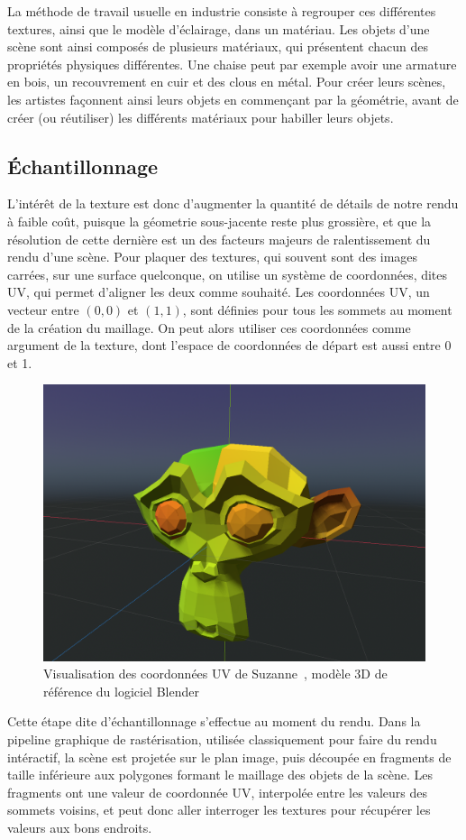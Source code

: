 La méthode de travail usuelle en industrie consiste à regrouper ces différentes textures, ainsi que le modèle d'éclairage, dans un matériau. Les objets d'une scène sont ainsi composés de plusieurs matériaux, qui présentent chacun des propriétés physiques différentes. Une chaise peut par exemple avoir une armature en bois, un recouvrement en cuir et des clous en métal. Pour créer leurs scènes, les artistes façonnent ainsi leurs objets en commençant par la géométrie, avant de créer (ou réutiliser) les différents matériaux pour habiller leurs objets.

\subsection*{Échantillonnage}

L'intérêt de la texture est donc d'augmenter la quantité de détails de notre rendu à faible coût, puisque la géometrie sous-jacente reste plus grossière, et que la résolution de cette dernière est un des facteurs majeurs de ralentissement du rendu d'une scène. Pour plaquer des textures, qui souvent sont des images carrées, sur une surface quelconque, on utilise un système de coordonnées, dites UV, qui permet d'aligner les deux comme souhaité. Les coordonnées UV, un vecteur entre $(0, 0)$ et $(1, 1)$, sont définies pour tous les sommets au moment de la création du maillage. On peut alors utiliser ces coordonnées comme argument de la texture, dont l'espace de coordonnées de départ est aussi entre 0 et 1.

\begin{figure}
    \centering
    \includegraphics[width=.55\textwidth]{contenu/resources/images/uv_suzanne}
    \caption[Coordonnées UV du modèle Suzanne]{Visualisation des coordonnées UV de Suzanne~\cite{suzanne-uv}, modèle 3D de référence du logiciel Blender}
    \label{fig:uv-suzanne}
\end{figure}

Cette étape dite d'échantillonnage s'effectue au moment du rendu. Dans la pipeline graphique de rastérisation, utilisée classiquement pour faire du rendu intéractif, la scène est projetée sur le plan image, puis découpée en fragments de taille inférieure aux polygones formant le maillage des objets de la scène. Les fragments ont une valeur de coordonnée UV, interpolée entre les valeurs des sommets voisins, et peut donc aller interroger les textures pour récupérer les valeurs aux bons endroits. 

